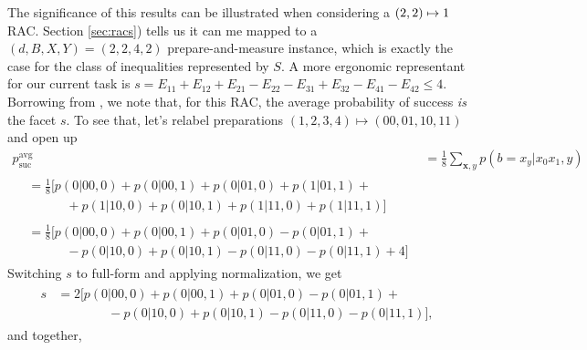             The significance of this results can be illustrated when considering a $\left( 2, 2 \right) \mapsto 1$ RAC. Section \ref{sec:racs}) tells us it can me mapped to a $(d,B,X,Y) = (2,2,4,2)$ prepare-and-measure instance, which is exactly the case for the class of inequalities represented by $S$. A more ergonomic representant for our current task is $s = E_{11} + E_{12} + E_{21} - E_{22} - E_{31} + E_{32} - E_{41} - E_{42} \leq 4$. Borrowing from \cite{pawlowski_pamqkd_2011}, we note that, for this RAC, the average probability of success \emph{is} the facet $s$. To see that, let's relabel preparations $\left( 1, 2, 3, 4 \right) \mapsto \left(00, 01, 10, 11\right)$ and open up
            \begin{align*}
                        p_{\text{suc}}^{\text{avg}} &= \frac{1}{8} \sum_{\mathbf{x}, y} p(b = x_y \vert x_0 x_1, y) \\
                        \begin{split}
                            &= \frac{1}{8} \big[ p(0 \vert 00, 0) + p(0 \vert 00, 1) + p(0 \vert 01, 0) + p(1 \vert 01, 1) + \\
                            &\quad\qquad + p(1 \vert 10, 0) + p(0 \vert 10, 1) + p(1 \vert 11, 0) + p(1 \vert 11, 1) \big]
                        \end{split}
                        \\
                        \begin{split}
                            &= \frac{1}{8} \big[ p(0 \vert 00, 0) + p(0 \vert 00, 1) + p(0 \vert 01, 0) - p(0 \vert 01, 1) + \\
                            &\quad\qquad - p(0 \vert 10, 0) + p(0 \vert 10, 1) - p(0 \vert 11, 0) - p(0 \vert 11, 1) + 4 \big]
                        \end{split}
            \end{align*}
            Switching $s$ to full-form and applying normalization, we get
            \begin{align*}
            \begin{split}
                s &= 2 \big[ p(0 \vert 00, 0) + p(0 \vert 00, 1) + p(0 \vert 01, 0) - p(0 \vert 01, 1) + \\
                &\qquad\qquad - p(0 \vert 10, 0) + p(0 \vert 10, 1) - p(0 \vert 11, 0) - p(0 \vert 11, 1) \big] ,
            \end{split}
            \end{align*}
            and together,
